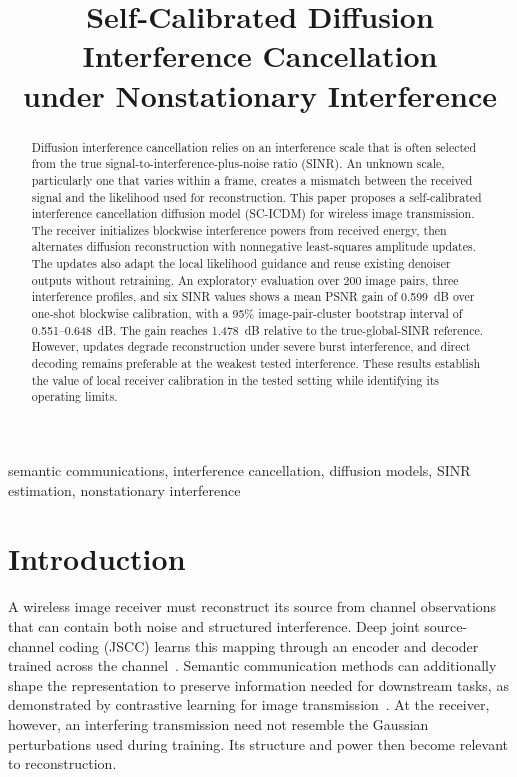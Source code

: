 \documentclass[conference]{IEEEtran}
\begin{document}
\title{Self-Calibrated Diffusion Interference Cancellation\\
under Nonstationary Interference}
\author{
}
\maketitle

\begin{abstract}
Diffusion interference cancellation relies on an interference scale that is
often selected from the true signal-to-interference-plus-noise ratio (SINR).
An unknown scale, particularly one that varies within a frame, creates a
mismatch between the received signal and the likelihood used for
reconstruction. This paper proposes a self-calibrated interference
cancellation diffusion model (SC-ICDM) for wireless image transmission.
The receiver initializes blockwise interference powers from received energy,
then alternates diffusion reconstruction with nonnegative least-squares
amplitude updates. The updates also adapt the local likelihood guidance and
reuse existing denoiser outputs without retraining. An exploratory evaluation
over 200 image pairs, three interference profiles, and six SINR values shows
a mean PSNR gain of 0.599~dB over one-shot blockwise calibration, with a
95\% image-pair-cluster bootstrap interval of 0.551--0.648~dB.
The gain reaches 1.478~dB relative to the true-global-SINR reference.
However, updates degrade reconstruction under severe burst interference,
and direct decoding remains preferable at the weakest tested interference.
These results establish the value of local receiver calibration in the
tested setting while identifying its operating limits.
\end{abstract}

\begin{IEEEkeywords}
semantic communications, interference cancellation, diffusion models,
SINR estimation, nonstationary interference
\end{IEEEkeywords}

\section{Introduction}

A wireless image receiver must reconstruct its source from channel
observations that can contain both noise and structured interference.
Deep joint source-channel coding (JSCC) learns this mapping through an
encoder and decoder trained across the channel~\cite{bourtsoulatze2019deep}.
Semantic communication methods can additionally shape the representation
to preserve information needed for downstream tasks, as demonstrated by
contrastive learning for image transmission~\cite{tang2023contrastive}.
At the receiver, however, an interfering transmission need not resemble
the Gaussian perturbations used during training. Its structure and power
then become relevant to reconstruction.
\end{document}
